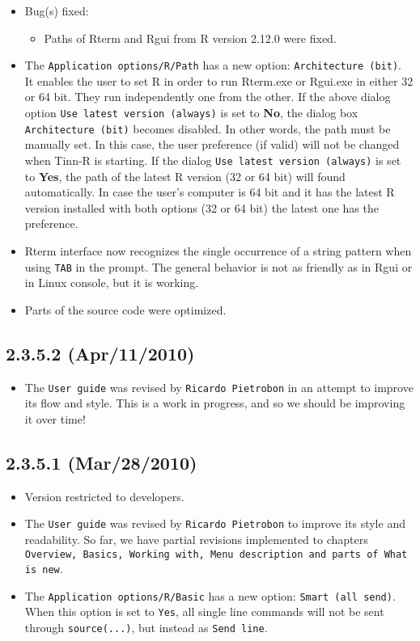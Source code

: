 \begin{itemize}
  \item Bug(s) fixed:
    \begin{itemize}
      \item Paths of Rterm and Rgui from R version 2.12.0 were fixed.
    \end{itemize}
  \item The \texttt{Application options/R/Path} has a new option: \texttt{Architecture (bit)}.
    It enables the user to set R in order to run Rterm.exe or Rgui.exe in either 32 or 64 bit.
    They run independently one from the other. If the above dialog option \texttt{Use latest version (always)} is set 
    to \textbf{No}, the dialog box \texttt{Architecture (bit)} becomes disabled.
    In other words, the path must be manually set. In this case, the user preference (if valid) will not be changed when Tinn-R is starting.
    If the dialog \texttt{Use latest version (always)} is set to \textbf{Yes}, the path of the latest R version (32 or 64 bit) will found automatically.
    In case the user's computer is 64 bit and it has the latest R version installed with both options (32 or 64 bit) the latest one has the preference.
  \item Rterm interface now recognizes the single occurrence of a string pattern when using \texttt{TAB} in the prompt.
    The general behavior is not as friendly as in Rgui or in Linux console, but it is working.
  \item Parts of the source code were optimized.
\end{itemize}

\subsection{2.3.5.2 (Apr/11/2010)}

\begin{itemize}
  \item The \texttt{User guide} was revised by \texttt{Ricardo Pietrobon}
    in an attempt to improve its flow and style. This is a work in progress,
    and so we should be improving it over time!
\end{itemize}


\subsection{2.3.5.1 (Mar/28/2010)}

\begin{itemize}
  \item Version restricted to developers.
  \item The \texttt{User guide} was revised by \texttt{Ricardo Pietrobon} to
    improve its style and readability. So far, we have partial revisions
    implemented to chapters \texttt{Overview, Basics, Working with, Menu
      description and parts of What is new}.
  \item The \texttt{Application options/R/Basic} has a new option:
    \texttt{Smart (all send)}. When this option is set to \texttt{Yes}, all
    single line commands will not be sent through \texttt{source(...)}, but
    instead as \texttt{Send line}.
\end{itemize}


